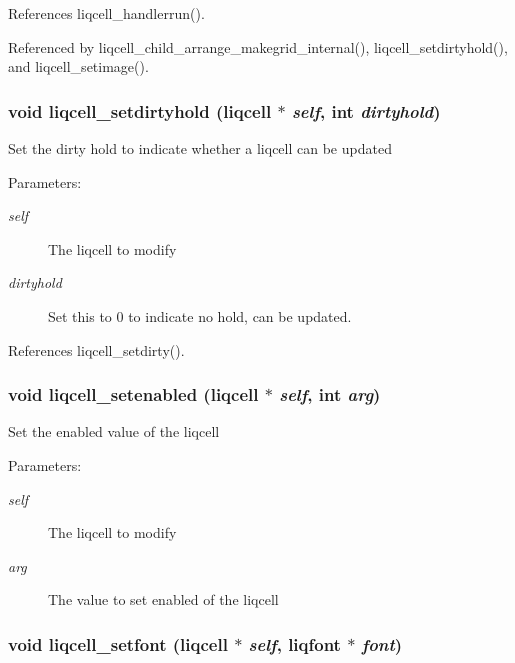 References liqcell\_\-handlerrun().

Referenced by liqcell\_\-child\_\-arrange\_\-makegrid\_\-internal(), liqcell\_\-setdirtyhold(), and liqcell\_\-setimage().
\subsubsection[{liqcell\_\-setdirtyhold}]{\setlength{\rightskip}{0pt plus 5cm}void liqcell\_\-setdirtyhold (liqcell $\ast$ {\em self}, \/  int {\em dirtyhold})}\label{d5/da2/liqcell_8c_d2d331cc053cb8bce4f328ca5f0f6913}


Set the dirty hold to indicate whether a liqcell can be updated \begin{Desc}
\item[Parameters:]
\begin{description}
\item[{\em self}]The liqcell to modify \item[{\em dirtyhold}]Set this to 0 to indicate no hold, can be updated. \end{description}
\end{Desc}


References liqcell\_\-setdirty().
\subsubsection[{liqcell\_\-setenabled}]{\setlength{\rightskip}{0pt plus 5cm}void liqcell\_\-setenabled (liqcell $\ast$ {\em self}, \/  int {\em arg})}\label{d5/da2/liqcell_8c_3d63be74972f519f17406bd677adfdfc}


Set the enabled value of the liqcell \begin{Desc}
\item[Parameters:]
\begin{description}
\item[{\em self}]The liqcell to modify \item[{\em arg}]The value to set enabled of the liqcell \end{description}
\end{Desc}
\subsubsection[{liqcell\_\-setfont}]{\setlength{\rightskip}{0pt plus 5cm}void liqcell\_\-setfont (liqcell $\ast$ {\em self}, \/  liqfont $\ast$ {\em font})}\label{d5/da2/liqcell_8c_bb948216eb0615940667c825814a16d3}



